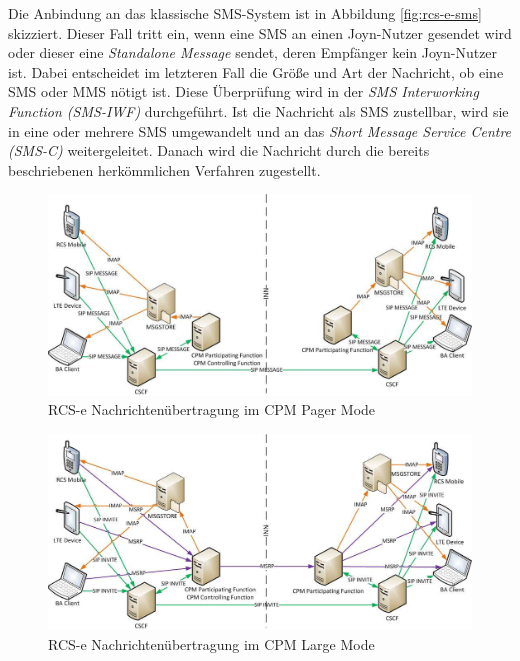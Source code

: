 \documentclass[german,12pt,a4paper]{article}
\begin{document}
    Die Anbindung an das klassische SMS-System ist in Abbildung \ref{fig:rcs-e-sms} skizziert.
    Dieser Fall tritt ein, wenn eine SMS an einen Joyn-Nutzer gesendet wird oder dieser eine
    \textit{Standalone Message} sendet, deren Empfänger kein  Joyn-Nutzer ist. Dabei
    entscheidet im letzteren Fall die Größe und Art der Nachricht, ob eine SMS oder MMS nötigt
    ist. Diese Überprüfung wird in der \textit{SMS Interworking Function (SMS-IWF)} durchgeführt.
    Ist die Nachricht als SMS zustellbar, wird sie in eine oder mehrere SMS umgewandelt und an das
    \textit{Short Message Service Centre (SMS-C)} weitergeleitet. Danach wird die Nachricht durch
    die bereits beschriebenen herkömmlichen Verfahren zugestellt.

 \begin{figure}
     \centering
     \includegraphics[width=\textwidth]{img/rcs-e-pager}
     \caption{RCS-e Nachrichtenübertragung im CPM Pager Mode \cite{rcs:spec}}
     \label{fig:rcs-e-pager}
 \end{figure}

 \begin{figure}
     \centering
     \includegraphics[width=\textwidth]{img/rcs-e-large}
     \caption{RCS-e Nachrichtenübertragung im CPM Large Mode \cite{rcs:spec}}
     \label{fig:rcs-e-large}
 \end{figure}
\end{document}
